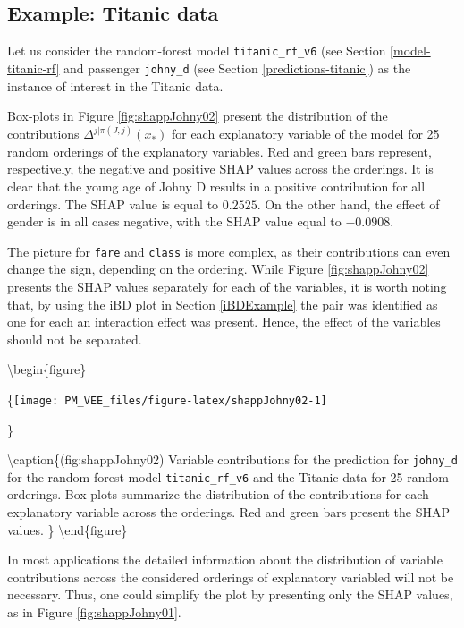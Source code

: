 \documentclass[12pt,]{krantz}
\begin{document}
\hypertarget{SHAPExample}{%
\subsection{Example: Titanic data}\label{SHAPExample}}

Let us consider the random-forest model \texttt{titanic\_rf\_v6} (see Section \ref{model-titanic-rf} and passenger \texttt{johny\_d} (see Section \ref{predictions-titanic}) as the instance of interest in the Titanic data.

Box-plots in Figure \ref{fig:shappJohny02} present the distribution of the contributions \(\Delta^{j|\pi(J,j)}(x_*)\) for each explanatory variable of the model for 25 random orderings of the explanatory variables. Red and green bars represent, respectively, the negative and positive SHAP values across the orderings. It is clear that the young age of Johny D results in a positive contribution for all orderings. The SHAP value is equal to \(0.2525\). On the other hand, the effect of gender is in all cases negative, with the SHAP value equal to \(-0.0908\).

The picture for \texttt{fare} and \texttt{class} is more complex, as their contributions can even change the sign, depending on the ordering. While Figure \ref{fig:shappJohny02} presents the SHAP values separately for each of the variables, it is worth noting that, by using the iBD plot in Section \ref{iBDExample} the pair was identified as one for each an interaction effect was present. Hence, the effect of the variables should not be separated.

\textbackslash{}begin\{figure\}

\{\centering \texttt{[image: PM\_VEE\_files/figure-latex/shappJohny02-1]}

\}

\textbackslash{}caption\{(fig:shappJohny02) Variable contributions for the prediction for \texttt{johny\_d} for the random-forest model \texttt{titanic\_rf\_v6} and the Titanic data for 25 random orderings. Box-plots summarize the distribution of the contributions for each explanatory variable across the orderings. Red and green bars present the SHAP values. \}\label{fig:shappJohny02}
\textbackslash{}end\{figure\}

In most applications the detailed information about the distribution of variable contributions across the considered orderings of explanatory variabled will not be necessary. Thus, one could simplify the plot by presenting only the SHAP values, as in Figure \ref{fig:shappJohny01}.
\end{document}
